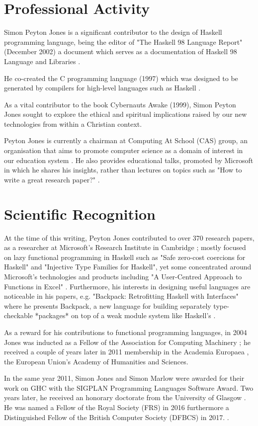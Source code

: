 \documentclass[twocolumn, 9pt]{article}
\begin{document}
\section{Professional Activity}
\label{sec::professional Activity}

Simon Peyton Jones is a significant contributor to the design of Haskell programming language, being the editor of "The Haskell 98 Language Report" (December 2002) a document which serves as a documentation of Haskell 98 Language and Libraries \cite{haskell98}.

He co-created the C\-\- programming language (1997) which was designed to be generated by compilers for high-level languages such as Haskell \cite{wiki:jones}. 

As a vital contributor to the book Cybernauts Awake (1999), Simon Peyton Jones sought to explore the ethical and spiritual implications raised by our new technologies from within a Christian context. 

Peyton Jones is currently a chairman at Computing At School (CAS) group, an organisation that aims to promote computer science as a domain of interest in our education system \cite{wiki:jones}. He also provides educational talks, promoted by Microsoft in which he shares his insights, rather than lectures on topics such as "How to write a great research paper?" \cite{htwagp}.

\section{Scientific Recognition}
\label{sec::scientific::recognition}


At the time of this writing, Peyton Jones contributed to over 370 research papers, as a researcher at Microsoft's Research Institute in Cambridge \cite{microsoft:research:jones}; mostly focused on lazy functional programming in Haskell such as "Safe zero-cost coercions for Haskell" and "Injective Type Families for Haskell", yet some concentrated around Microsoft's technologies and products including "A User-Centred Approach to Functions in Excel" \cite{microsoft:research:jones}. Furthermore, his interests in designing useful languages are noticeable in his papers, e.g. "Backpack: Retrofitting Haskell with Interfaces" where he presents Backpack, a new language for building separately type-checkable *packages* on top of a weak module system like Haskell's \cite{backpack}. 

As a reward for his contributions to functional programming languages, in 2004 Jones was inducted as a Fellow of the Association for Computing Machinery \cite{wiki:jones}; he received a couple of years later in 2011 membership in the Academia Europaea \cite{wiki:jones}, the European Union's Academy of Humanities and Sciences.

In the same year 2011, Simon Jones and Simon Marlow were awarded for their work on GHC with the SIGPLAN Programming Languages Software Award. Two years later, he received an honorary doctorate from the University of Glasgow \cite{wiki:jones}. He was named a Fellow of the Royal Society (FRS) in 2016 furthermore a Distinguished Fellow of the British Computer Society (DFBCS) in 2017. \cite{wiki:jones}.

\printbibliography
\end{document}
